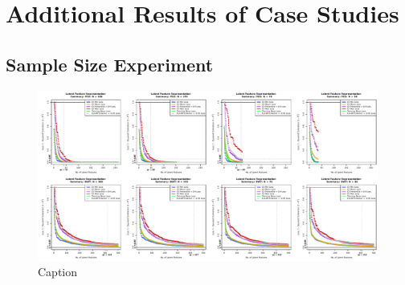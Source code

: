 \section{Additional Results of Case Studies}\label{sec:additional-results}

\subsection{Sample Size Experiment}

\begin{figure}
    \centering
    \includegraphics[width=1\linewidth]{figures/eye-sample-size-results-results-02.pdf}
    \caption{Caption}
    \label{fig:eye-sample-size-results-results-02}
\end{figure}